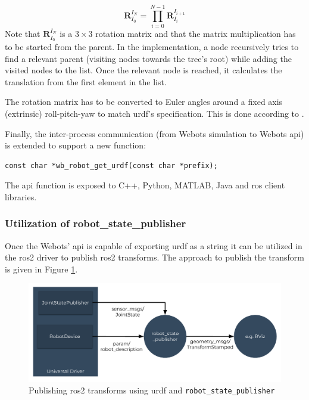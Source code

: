 \begin{equation}
    \bm{R}_{I_0}^{I_N} = \prod_{i=0}^{N-1} \bm{R}_{I_i}^{I_{i+1}}
\end{equation}
Note that $ \bm{R}_{I_0}^{I_N} $ is a $ 3 \times 3 $ rotation matrix and that the matrix multiplication has to be started from the parent.
In the implementation, a node recursively tries to find a relevant parent (visiting nodes towards the tree's root) while adding the visited nodes to the list.
Once the relevant node is reached, it calculates the translation from the first element in the list.

The rotation matrix has to be converted to Euler angles around a fixed axis (extrinsic) roll-pitch-yaw to match \ac{urdf}'s specification. This is done according to \cite[p. 9]{eberly_euler_nodate}.

Finally, the inter-process communication (from Webots simulation to Webots \ac{api}) is extended to support a new function:

\begin{verbatim}
const char *wb_robot_get_urdf(const char *prefix);
\end{verbatim}

The \ac{api} function is exposed to C++, Python, MATLAB, Java and \ac{ros} client libraries.

\subsubsection{Utilization of robot\_state\_publisher}

Once the Webots' \ac{api} is capable of exporting \ac{urdf} as a string it can be utilized in the \ac{ros2} driver to publish \ac{ros2} transforms.
The approach to publish the transform is given in Figure \ref{fig:generalization:transforms_method_3}.

\begin{figure}[H]
    \centering
    \includegraphics[width=\textwidth]{generalization/figures/transforms_method_3.pdf}
    \caption{Publishing \ac{ros2} transforms using \ac{urdf} and \texttt{robot\_state\_publisher}}
    \label{fig:generalization:transforms_method_3}
\end{figure}

